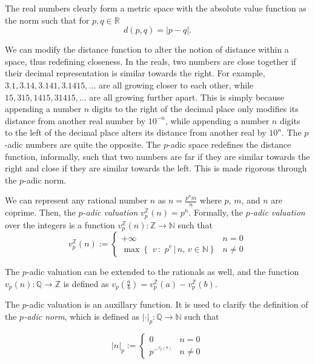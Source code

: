 \documentclass[a4paper]{article}
\begin{document}
The real numbers clearly form a metric space with the absolute value function as the norm such that for $p, q \in \mathbb{R}$ 
	\[d(p, q) = |p-q|.\]
 
We can modify the distance function to alter the notion of distance within a space, thus redefining closeness. In the reals, two numbers are close together if their decimal representation is similar towards the right. For example, $3.1, 3.14, 3.141, 3.1415,...$ are all growing closer to each other, while $15, 315, 1415, 31415,...$ are all growing further apart. This is simply because appending a number $n$ digits to the right of the decimal place only modifies its distance from another real number by $10^{-n}$, while appending a number $n$ digits to the left of the decimal place alters its distance from another real by $10^{n}$. The $p$-adic numbers are quite the opposite. The $p$-adic space redefines the distance function, informally, such that two numbers are far if they are similar towards the right and close if they are similar towards the left. This is made rigorous through the $p$-adic norm. 

\begin{definition}{}
We can represent any rational number $n$ as $n=\frac{p^nm}{n}$ where $p$, $m$, and $n$ are coprime. Then, the \textit{$p$-adic valuation} $v_p^\mathbb{Z}(n)=p^n$. Formally, the \textit{$p$-adic valuation} over the integers is a function $v_p^\mathbb{Z}(n): \mathbb{Z} \rightarrow \mathbb{N}$ such that  
\[v_p^\mathbb{Z}(n):= \begin{cases} 
      +\infty & n= 0 \\
     \max{\left\{\,\,v \,:\,\, p^v \,|\, n, \,v \in \mathbb{N} \right\}} & n \neq 0
   \end{cases}
\]

The $p$-adic valuation can be extended to the rationals as well, and the function $v_p(n): \mathbb{Q} \rightarrow \mathbb{Z}$ is defined as $v_p(\frac{a}{b})= v_p^\mathbb{Z}(a) - v_p^\mathbb{Z}(b)$.
\end{definition}

\begin{definition}{}
The $p$-adic valuation is an auxillary function. It is used to clarify the definition of the \textit{$p$-adic norm}, which is defined as $|\cdot|_p:\mathbb{Q}\rightarrow \mathbb{N} $ such that

\[|n|_p:= \begin{cases} 
      0 & n= 0 \\
     p^{-^{v_p(n)}} & n \neq 0
   \end{cases}
\]

\end{definition}
\end{document}
